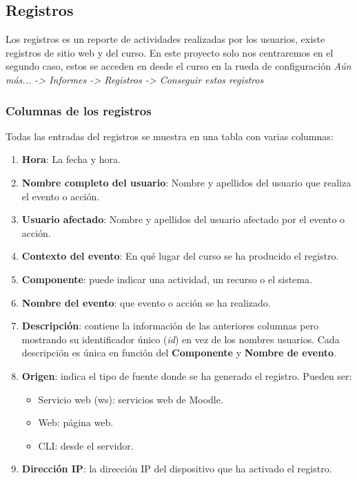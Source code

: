 
\subsection{Registros}
Los registros es un reporte de actividades realizadas por los usuarios, existe registros de sitio web y del curso. En este proyecto solo nos centraremos en el segundo caso, estos se acceden en desde el curso en la rueda de configuración \textit{Aún más... ->  Informes ->  Registros -> Conseguir estos registros}


\subsubsection{Columnas de los registros}
Todas las entradas del registros se muestra en una tabla con varias columnas: 
\begin{enumerate}
	\item \textbf{Hora}: La fecha y hora.
	\item \textbf{Nombre completo del usuario}: Nombre y apellidos del usuario que realiza el evento o acción.
	\item \textbf{Usuario afectado}: Nombre y apellidos del usuario afectado por el evento o acción.
	\item \textbf{Contexto del evento}: En qué lugar del curso se ha producido el registro.
	\item \textbf{Componente}: puede indicar una actividad, un recurso o el sistema.
	\item \textbf{Nombre del evento}: que evento o acción se ha realizado.
	\item \textbf{Descripción}: contiene la información de las anteriores columnas pero mostrando su identificador único (\textit{id}) en vez de los nombres usuarios. Cada descripción es única en función del \textbf{Componente} y \textbf{Nombre de evento}.
	\item \textbf{Origen}: indica el tipo de fuente donde se ha generado el registro. Pueden ser:
	\begin{itemize}
		\item Servicio web (ws): servicios web de Moodle.
		\item Web: página web.
		\item CLI: desde el servidor.
	\end{itemize}
	\item \textbf{Dirección IP}: la dirección IP del dispositivo que ha activado el registro.
	
\end{enumerate}

